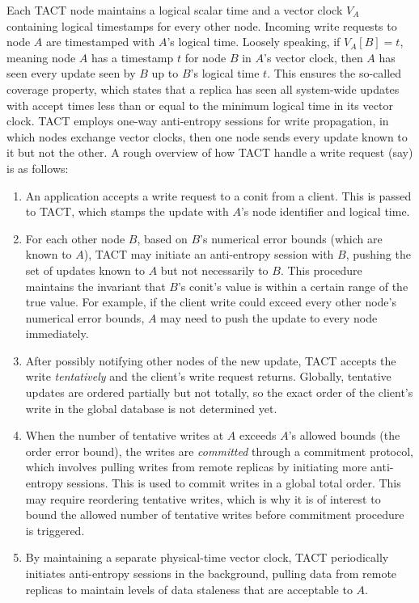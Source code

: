 Each TACT node maintains a logical scalar time and a vector clock
$V_A$ containing logical timestamps for every other node. Incoming
write requests to node $A$ are timestamped with $A$'s logical
time. Loosely speaking, if $V_A[B]=t$, meaning node $A$ has a
timestamp $t$ for node $B$ in $A$'s vector clock, then $A$ has seen
every update seen by $B$ up to $B$'s logical time $t$.  This ensures
the so-called coverage property, which states that a replica has seen
all system-wide updates with accept times less than or equal to the
minimum logical time in its vector clock. TACT employs one-way
anti-entropy sessions for write propagation, in which nodes exchange
vector clocks, then one node sends every update known to it but not
the other. A rough overview of how TACT handle a write request (say)
is as follows:
\begin{enumerate}
\item An application accepts a write request to a conit from a
  client. This is passed to TACT, which stamps the update with $A$'s
  node identifier and logical time.
\item For each other node $B$, based on $B$'s numerical error bounds
  (which are known to $A$), TACT may initiate an anti-entropy session
  with $B$, pushing the set of updates known to $A$ but not
  necessarily to $B$. This procedure maintains the invariant that
  $B$'s conit's value is within a certain range of the true value. For
  example, if the client write could exceed every other node's
  numerical error bounds, $A$ may need to push the update to every
  node immediately.
\item After possibly notifying other nodes of the new update, TACT
  accepts the write \emph{tentatively} and the client's write request
  returns.  Globally, tentative updates are ordered partially but not
  totally, so the exact order of the client's write in the global
  database is not determined yet.
\item When the number of tentative writes at $A$ exceeds $A$'s allowed
  bounds (the order error bound), the writes are \emph{committed}
  through a commitment protocol, which involves pulling writes from
  remote replicas by initiating more anti-entropy sessions. This is
  used to commit writes in a global total order. This may require
  reordering tentative writes, which is why it is of interest to bound
  the allowed number of tentative writes before commitment procedure
  is triggered.
\item By maintaining a separate physical-time vector clock, TACT
  periodically initiates anti-entropy sessions in the background,
  pulling data from remote replicas to maintain levels of data
  staleness that are acceptable to $A$.
\end{enumerate}

